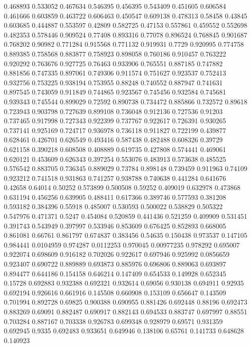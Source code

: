 0.468893 0.533052
0.467634 0.546395
0.456395 0.543409
0.451605 0.606584
0.461666 0.603859
0.463722 0.606463
0.450547 0.609138
0.478313 0.58458
0.43845 0.603685
0.444887 0.553597
0.42809 0.582725
0.47153 0.557861
0.459552 0.552698
0.482353 0.578446
0.909524 0.77408
0.893316 0.77078
0.896524 0.768845
0.901687 0.768202
0.90982 0.771284
0.915568 0.771132
0.919931 0.7729
0.920995 0.774758
0.889385 0.758568
0.883877 0.758923
0.898058 0.760186
0.910457 0.763222
0.920292 0.763676
0.927725 0.76463
0.933906 0.765551
0.887185 0.747882
0.881856 0.747335
0.897061 0.749306
0.911574 0.751627
0.923537 0.752413
0.932756 0.753225
0.938194 0.753955
0.88248 0.740552
0.887947 0.741631
0.897545 0.743059
0.911849 0.744865
0.923567 0.745456
0.932584 0.745681
0.939343 0.745544
0.899029 0.72592
0.890738 0.734472
0.885866 0.732572
0.89618 0.723943
0.903798 0.727639
0.899108 0.736048
0.912136 0.727536
0.91203 0.737465
0.917998 0.727343
0.922399 0.737767
0.922617 0.726391
0.930265 0.737141
0.925169 0.724717
0.936978 0.736118
0.911827 0.722199
0.439877 0.628461
0.426701 0.626549
0.493416 0.587438
0.482488 0.608326
0.39729 0.621158
0.390218 0.608508
0.408889 0.619735
0.427808 0.574441
0.469061 0.620121
0.453609 0.626343
0.397254 0.553076
0.483913 0.573638
0.485525 0.576542
0.883705 0.736345
0.889029 0.73784
0.898148 0.739459
0.911963 0.74109
0.923212 0.741518
0.931863 0.741257
0.938788 0.740638
0.441284 0.641676
0.42658 0.64014
0.50252 0.573899
0.500508 0.59252
0.409019 0.632978
0.473868 0.631194
0.456256 0.639905
0.488411 0.617366
0.389746 0.577593
0.381208 0.593182
0.384396 0.55918
0.485007 0.530593
0.500022 0.538829
0.505322 0.547976
0.471371 0.5247
0.454084 0.520859
0.441436 0.521259
0.409909 0.531451
0.391743 0.543949
0.397997 0.533946
0.853609 0.676425
0.852893 0.668005
0.861081 0.66761
0.861797 0.674837
0.383456 0.54635
0.150438 0.973537
0.147105 0.984441
0.0104959 0.974287
0.0112253 0.970045
0.00977235 0.978292
0.695007 0.922074
0.698609 0.916182
0.702026 0.922617
0.697946 0.925992
0.0856659 0.923407
0.690722 0.889889
0.693873 0.885976
0.696806 0.889063
0.693897 0.894477
0.644186 0.154158
0.646214 0.147409
0.654533 0.149928
0.652345 0.15728
0.692883 0.932388
0.692321 0.932614
0.69056 0.930138
0.694911 0.92935
0.692194 0.926616
0.661916 0.145508
0.660908 0.153109
0.656647 0.143509
0.701994 0.892728
0.69825 0.900388
0.690955 0.881426
0.692448 0.88196
0.692473 0.883269
0.69091 0.882487
0.690917 0.882143
0.694533 0.883747
0.697997 0.88551
0.703284 0.887167
0.703338 0.926783
0.699348 0.928979
0.69571 0.931359
0.692945 0.9335
0.692483 0.933651
0.649946 0.138106
0.65761 0.141733
0.648628 0.140923
